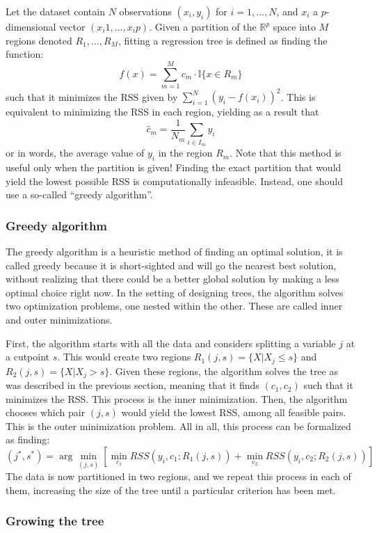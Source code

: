 \documentclass[12pt]{report}
\begin{document}
Let the dataset contain $N$ observations $(x_i, y_i)$ for $i = 1, ..., N$, and $x_i$ a $p$-dimensional vector $(x_i1, ..., x_ip)$. Given a partition of the $\mathbb{R}^p$ space into $M$ regions denoted $R_1, ..., R_M$, fitting a regression tree is defined as finding the function: $$f(x) = \sum_{m=1}^M c_m\cdot \mathbb{I}\{x \in R_m\} $$ such that it minimizes the RSS given by $\sum_{i=1}^N (y_i - f(x_i))^2$. This is equivalent to minimizing the RSS in each region, yielding as a result that $$\hat c_m = \frac{1}{N_m}\sum_{i\in I_m} y_i $$ or in words, the average value of $y_i$ in the region $R_m$. Note that this method is useful only when the partition is given! Finding the exact partition that would yield the lowest possible RSS is computationally infeasible. Instead, one should use a so-called ``greedy algorithm''.

\subsubsection{Greedy algorithm}

The greedy algorithm is a heuristic method of finding an optimal solution, it is called greedy because it is short-sighted and will go the nearest best solution, without realizing that there could be a better global solution by making a less optimal choice right now. In the setting of designing trees, the algorithm solves two optimization problems, one nested within the other. These are called inner and outer minimizations.

First, the algorithm starts with all the data and considers splitting a variable $j$ at a cutpoint $s$. This would create two regions $R_1(j,s) = \{X\vert X_j \leq s\}$ and $R_2(j,s) = \{X\vert X_j > s\}$. Given these regions, the algorithm solves the tree as was described in the previous section, meaning that it finds $(c_1, c_2)$ such that it minimizes the RSS. This process is the inner minimization. Then, the algorithm chooses which pair $(j, s)$ would yield the lowest RSS, among all feasible pairs. This is the outer minimization problem. All in all, this process can be formalized as finding: $$(j^*, s^*) = \arg\min_{(j,s)} \left[ \min_{c_1} RSS(y_i,c_1; R_1(j,s)) + \min_{c_2} RSS(y_i,c_2; R_2(j,s)) \right] $$ The data is now partitioned in two regions, and we repeat this process in each of them, increasing the size of the tree until a particular criterion has been met.

\subsubsection{Growing the tree}
\end{document}
